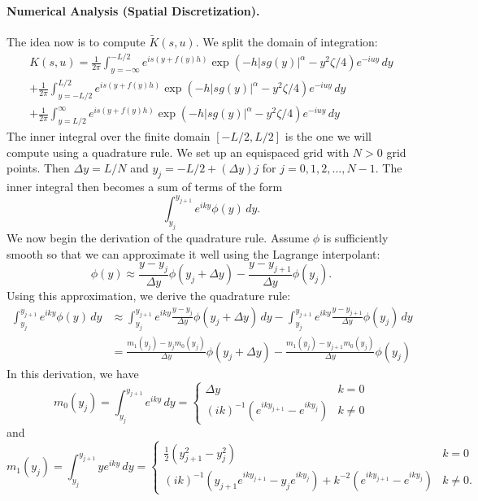 \documentclass[11pt,letterpaper]{article}
\begin{document}
\paragraph{Numerical Analysis (Spatial Discretization).} The idea now is to compute $\widetilde{K}(s,u)$.  We split the domain of integration:
\begin{multline*}
K(s,u) = \frac{1}{2 \pi} \int_{y=-\infty}^{-L/2} e^{is\left(y+f(y)h\right)}\exp{\left(  -h |s g(y)|^{\alpha} -y^2 \zeta/4 \right)}e^{-iuy}\, dy \\
 + \frac{1}{2 \pi} \int_{y=-L/2}^{L/2} e^{is\left(y+f(y)h\right)}\exp{\left(  -h |s g(y)|^{\alpha} -y^2 \zeta/4 \right)}e^{-iuy}\, dy \\
 + \frac{1}{2 \pi} \int_{y=L/2}^{\infty} e^{is\left(y+f(y)h\right)}\exp{\left(  -h |s g(y)|^{\alpha} -y^2 \zeta/4 \right)}e^{-iuy}\, dy
\end{multline*}
The inner integral over the finite domain $[-L/2, L/2]$ is the one we will compute using a quadrature rule.  We set up an equispaced grid with $N > 0$ grid points.  Then $\Delta y = L/N$ and $y_j = -L/2 + (\Delta y) j$ for $j = 0, 1, 2, \ldots, N-1$.  The inner integral then becomes a sum of terms of the form
\[
\int_{y_j}^{y_{j+1}} e^{i k y} \phi(y) \, dy.
\]
We now begin the derivation of the quadrature rule.  Assume $\phi$ is sufficiently smooth so that we can approximate it well using the Lagrange interpolant:
\[
\phi(y) \approx \frac{y - y_j}{\Delta y} \phi(y_j + \Delta y) - \frac{y - y_{j+1}}{\Delta y} \phi(y_j).
\]
Using this approximation, we derive the quadrature rule:
\begin{align}
\int_{y_j}^{y_{j+1}} e^{i k y} \phi(y) \, dy &\approx \int_{y_j}^{y_{j+1}} e^{i k y} \frac{y - y_j}{\Delta y} \phi(y_j + \Delta y) \, dy - \int_{y_j}^{y_{j+1}} e^{i k y} \frac{y - y_{j+1}}{\Delta y} \phi(y_j) \, dy \nonumber \\
\label{eqn:quadrule}
 &= \frac{m_1(y_j) - y_j m_0(y_j)}{\Delta y} \phi(y_j + \Delta y) - \frac{m_1(y_j) - y_{j+1} m_0(y_j)}{\Delta y} \phi(y_j) 
\end{align}
In this derivation, we have
\[
m_0(y_j) = \int_{y_j}^{y_{j+1}} e^{i k y} \, dy = \begin{cases} \Delta y & k=0 \\ (ik)^{-1} (e^{i k y_{j+1}} - e^{i k y_j}) & k \neq 0 \end{cases}
\]
and
\[
m_1(y_j) = \int_{y_j}^{y_{j+1}} y e^{i k y} \, dy = \begin{cases} \frac{1}{2} (y_{j+1}^2 - y_j^2) & k = 0 \\ (i k)^{-1}( y_{j+1} e^{i k y_{j+1}} - y_j e^{i k y_j}) + k^{-2} (e^{i k y_{j+1}} - e^{i k y_j}) & k \neq 0. \end{cases}
\]
\end{document}
